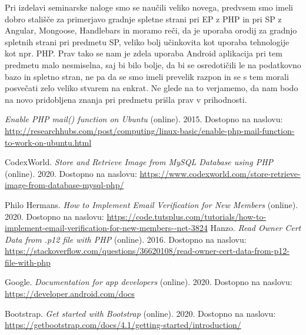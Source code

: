 \documentclass[a4paper,12pt]{report}
\begin{document}
Pri izdelavi seminarske naloge smo se naučili veliko novega, predvsem smo imeli dobro stališče za primerjavo gradnje spletne strani pri EP z PHP in pri SP z Angular, Mongoose, Handlebars in moramo reči, da je uporaba orodij za gradnjo spletnih strani pri predmetu SP, veliko bolj učinkovita kot uporaba  tehnologije kot npr. PHP. Prav tako se nam je zdela uporaba Android aplikacija pri tem predmetu malo nesmiselna, saj bi bilo bolje, da bi se osredotičili le na podatkovno bazo in spletno stran, ne pa da se smo imeli prevelik razpon in se s tem morali posvečati zelo veliko stvarem na enkrat. Ne glede na to verjamemo, da nam bodo na novo pridobljena znanja pri predmetu prišla prav v prihodnosti.
\begin{thebibliography}{99}
\addtocounter{chapter}{1}

 \emph{Enable PHP mail() function on Ubuntu} (online). 2015. Dostopno na naslovu:
\url{http://researchhubs.com/post/computing/linux-basic/enable-php-mail-function-to-work-on-ubuntu.html}

 CodexWorld. \emph{Store and Retrieve Image from MySQL Database using PHP} (online). 2020. Dostopno na naslovu:
\url{https://www.codexworld.com/store-retrieve-image-from-database-mysql-php/}

 Philo Hermans. \emph{How to Implement Email Verification for New Members} (online). 2020. Dostopno na naslovu:
\url{https://code.tutsplus.com/tutorials/how-to-implement-email-verification-for-new-members--net-3824}
 Hanzo. \emph{Read Owner Cert Data from .p12 file with PHP} (online). 2016. Dostopno na naslovu:
\url{https://stackoverflow.com/questions/36620108/read-owner-cert-data-from-p12-file-with-php}

 Google. \emph{Documentation for app developers} (online). 2020. Dostopno na naslovu:
\url{https://developer.android.com/docs}

 Bootstrap. \emph{Get started with Bootstrap} (online). 2020. Dostopno na naslovu:
\url{https://getbootstrap.com/docs/4.1/getting-started/introduction/}

\end{thebibliography}

\end{document}
